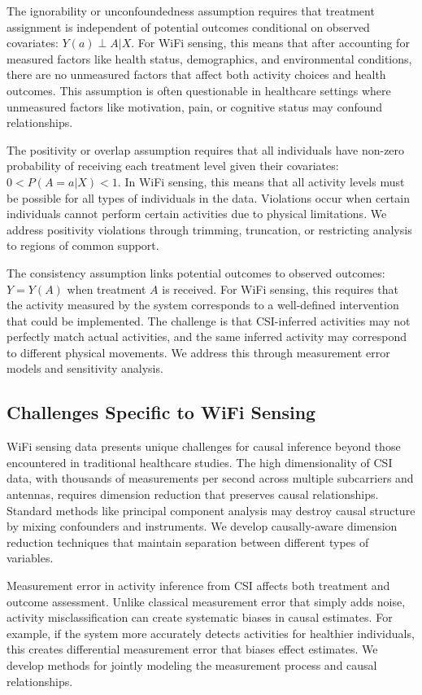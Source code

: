 \documentclass[journal]{IEEEtran}
\begin{document}
The ignorability or unconfoundedness assumption requires that treatment assignment is independent of potential outcomes conditional on observed covariates: $Y(a) \perp A | X$. For WiFi sensing, this means that after accounting for measured factors like health status, demographics, and environmental conditions, there are no unmeasured factors that affect both activity choices and health outcomes. This assumption is often questionable in healthcare settings where unmeasured factors like motivation, pain, or cognitive status may confound relationships.

The positivity or overlap assumption requires that all individuals have non-zero probability of receiving each treatment level given their covariates: $0 < P(A = a | X) < 1$. In WiFi sensing, this means that all activity levels must be possible for all types of individuals in the data. Violations occur when certain individuals cannot perform certain activities due to physical limitations. We address positivity violations through trimming, truncation, or restricting analysis to regions of common support.

The consistency assumption links potential outcomes to observed outcomes: $Y = Y(A)$ when treatment $A$ is received. For WiFi sensing, this requires that the activity measured by the system corresponds to a well-defined intervention that could be implemented. The challenge is that CSI-inferred activities may not perfectly match actual activities, and the same inferred activity may correspond to different physical movements. We address this through measurement error models and sensitivity analysis.

\subsection{Challenges Specific to WiFi Sensing}

WiFi sensing data presents unique challenges for causal inference beyond those encountered in traditional healthcare studies. The high dimensionality of CSI data, with thousands of measurements per second across multiple subcarriers and antennas, requires dimension reduction that preserves causal relationships. Standard methods like principal component analysis may destroy causal structure by mixing confounders and instruments. We develop causally-aware dimension reduction techniques that maintain separation between different types of variables.

Measurement error in activity inference from CSI affects both treatment and outcome assessment. Unlike classical measurement error that simply adds noise, activity misclassification can create systematic biases in causal estimates. For example, if the system more accurately detects activities for healthier individuals, this creates differential measurement error that biases effect estimates. We develop methods for jointly modeling the measurement process and causal relationships.
\end{document}
